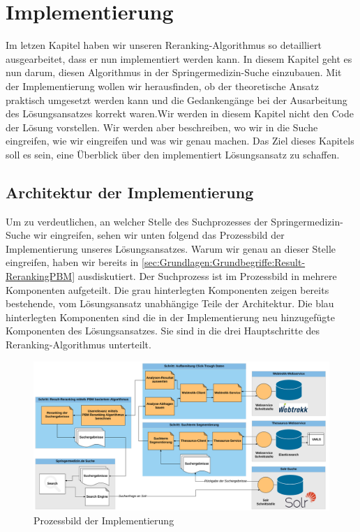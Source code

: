 %
\chapter{Implementierung}
\label{sec:Implementierung}

Im letzen Kapitel haben wir unseren Reranking-Algorithmus so detailliert ausgearbeitet, dass er nun implementiert werden kann. In diesem Kapitel geht es nun darum, diesen Algorithmus in der Springermedizin-Suche einzubauen. Mit der Implementierung wollen wir herausfinden, ob der theoretische Ansatz praktisch umgesetzt werden kann und die Gedankengänge bei der Ausarbeitung des Lösungsansatzes korrekt waren.Wir werden in diesem Kapitel nicht den Code der Lösung vorstellen. Wir werden aber beschreiben, wo wir in die Suche eingreifen, wie wir eingreifen und was wir genau machen. Das Ziel dieses Kapitels soll es sein, eine Überblick über den implementiert Lösungsansatz zu schaffen.

\section{Architektur der Implementierung}
\label{sec:Implementierung:Architektur}

Um zu verdeutlichen, an welcher Stelle des Suchprozesses der Springermedizin-Suche wir eingreifen, sehen wir unten folgend das Prozessbild der Implementierung unseres Lösungsansatzes. Warum wir genau an dieser Stelle eingreifen, haben wir bereits in \ref{sec:Grundlagen:Grundbegriffe:Result-RerankingPBM} ausdiskutiert. Der Suchprozess ist im Prozessbild in mehrere Komponenten aufgeteilt. Die grau hinterlegten Komponenten zeigen bereits bestehende, vom Lösungsansatz unabhängige Teile der Architektur. Die blau hinterlegten Komponenten sind die in der Implementierung neu hinzugefügte Komponenten des Lösungsansatzes. Sie sind in die drei Hauptschritte des Reranking-Algorithmus unterteilt.

\begin{figure}[H]
\centering
\vspace{-1em}
\caption[Prozessbild der Implementierung]{Prozessbild der Implementierung}
\label{fig:ProzessbildImplementierung}
\includegraphics[width=\linewidth]{gfx/ImplementierungProzessbild}
\vspace{-2.5em}
\end{figure}

